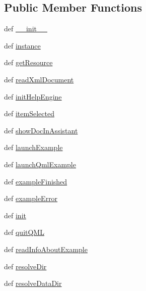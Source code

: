 \subsection*{Public Member Functions}
\begin{DoxyCompactItemize}
\item 
def \hyperlink{classmenumanager_1_1MenuManager_a7ed788ce5c876a422820abad432cb521}{\+\_\+\+\_\+init\+\_\+\+\_\+}
\item 
def \hyperlink{classmenumanager_1_1MenuManager_aec95de326ec7015989476cdcc665203c}{instance}
\item 
def \hyperlink{classmenumanager_1_1MenuManager_a49acc0538a2b908a89b15aa7ec8a4aac}{get\+Resource}
\item 
def \hyperlink{classmenumanager_1_1MenuManager_af81a890752b761372042854973f5b23d}{read\+Xml\+Document}
\item 
def \hyperlink{classmenumanager_1_1MenuManager_ac6f4b152c029caad315bb87aabdc7db4}{init\+Help\+Engine}
\item 
def \hyperlink{classmenumanager_1_1MenuManager_a31360577b83a7085ff4c05712ca60fa5}{item\+Selected}
\item 
def \hyperlink{classmenumanager_1_1MenuManager_a238eb97c19e8a892e27746c7ddce28cc}{show\+Doc\+In\+Assistant}
\item 
def \hyperlink{classmenumanager_1_1MenuManager_a3602c712b17f11ea35fb4ac4e3b1f07b}{launch\+Example}
\item 
def \hyperlink{classmenumanager_1_1MenuManager_ad3b65c1ca2c35b88d1209454d5ffc00f}{launch\+Qml\+Example}
\item 
def \hyperlink{classmenumanager_1_1MenuManager_ad98177eeea5a3ddc9541f34118303544}{example\+Finished}
\item 
def \hyperlink{classmenumanager_1_1MenuManager_a6f4f9b52bf67556fb6c2a4b427b4b21d}{example\+Error}
\item 
def \hyperlink{classmenumanager_1_1MenuManager_a78998748f1a668380f93bac15886fe85}{init}
\item 
def \hyperlink{classmenumanager_1_1MenuManager_a3d81e6ee6b41ce62d7b3987cd12ed4be}{quit\+Q\+M\+L}
\item 
def \hyperlink{classmenumanager_1_1MenuManager_ac01e2a44a4c53062c9d399021aa08954}{read\+Info\+About\+Example}
\item 
def \hyperlink{classmenumanager_1_1MenuManager_af8c38f492f52b299e05d71ffac9c541d}{resolve\+Dir}
\item 
def \hyperlink{classmenumanager_1_1MenuManager_ad400c09fe92d20b71cd878560a021361}{resolve\+Data\+Dir}

\end{DoxyCompactItemize}
